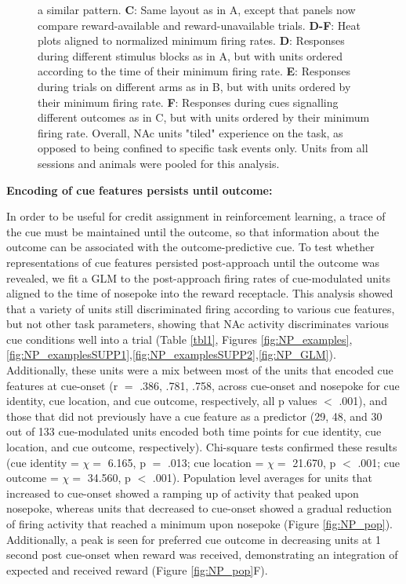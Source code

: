 \documentclass[11pt]{article}
\newcommand{\bsf}[1]{\textbf{#1}}
\begin{document}
\begin{figure}[ht!]
{a similar pattern. \bsf{C}: Same layout as in A, except that panels now
compare reward-available and reward-unavailable trials. \bsf{D-F}: Heat plots
aligned to normalized minimum firing rates. \bsf{D}: Responses during
different stimulus blocks as in A, but with units ordered according to the
time of their minimum firing rate. \bsf{E}: Responses during trials on
different arms as in B, but with units ordered by their minimum firing
rate. \bsf{F}: Responses during cues signalling different outcomes as in C,
but with units ordered by their minimum firing rate. Overall, NAc units
"tiled" experience on the task, as opposed to being confined to specific task
events only. Units from all sessions and animals were pooled for this
analysis.}
\label{fig:tiling}
\end{figure} \clearpage

{\bf Encoding of cue features persists until outcome:}

In order to be useful for credit assignment in reinforcement learning, a trace of the cue must be maintained until the outcome, so that information about the outcome can be associated with the outcome-predictive cue. To test whether representations of cue features persisted post-approach until the outcome was revealed, we fit a GLM to the post-approach firing rates of cue-modulated units aligned to the time of nosepoke into the reward receptacle. This analysis
showed that a variety of units still discriminated firing according to various cue features, but not other task parameters, showing that NAc activity discriminates various cue conditions well into a trial (Table \ref{tbl1}, Figures \ref{fig:NP_examples},\ref{fig:NP_examplesSUPP1},\ref{fig:NP_examplesSUPP2},\ref{fig:NP_GLM}). Additionally, these units were a mix between most of the units that encoded cue features at cue-onset (r $=$ .386, .781, .758, across cue-onset and nosepoke for cue identity, cue location, and cue outcome, respectively, all p values $<$ .001), and those that did not previously have a cue feature as a predictor (29, 48, and 30 out of 133 cue-modulated units encoded both time points for cue identity, cue location, and cue outcome, respectively). Chi-square tests confirmed these results (cue identity =  $\chi =$ 6.165, p $=$ .013; cue location = $\chi =$ 21.670, p $<$ .001; cue outcome = $\chi =$ 34.560, p $<$ .001). Population level averages for units that increased to cue-onset showed a ramping up of activity that peaked upon nosepoke, whereas units that decreased to cue-onset showed a gradual reduction of firing activity that reached a minimum upon nosepoke (Figure \ref{fig:NP_pop}). Additionally, a peak is seen for preferred cue outcome in decreasing units at 1 second post cue-onset when reward was received, demonstrating an integration of expected and received reward (Figure \ref{fig:NP_pop}F). 
\end{document}
